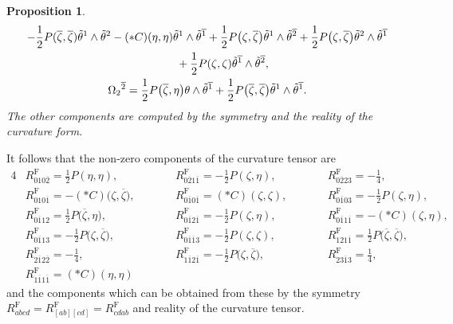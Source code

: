 \documentclass[11pt]{article}
\numberwithin{equation}{section}
\newcommand\ol{\overline}
\numberwithin{equation}{section}
\newtheorem{Proposition}[Theorem]{Proposition}
 { \theoremstyle{definition}
\newtheorem{Definition}[Theorem]{Definition}
\newtheorem*{Notation}{Notation}
\newtheorem{Example}[Theorem]{Example}
\newtheorem{Remark}[Theorem]{Remark} }
\begin{document}
\begin{Proposition}
\begin{gather*}
 -\frac{1}{2}P(\ol\zeta ,\ol\zeta)\tilde\theta^1\wedge\tilde\theta^2
-(*C)(\eta, \eta)\tilde\theta^1\wedge\tilde\theta^{\ol1}
+\frac{1}{2}
P\bigl(\zeta, \ol\zeta\bigr)\tilde\theta^1\wedge\tilde\theta^{\ol2}
+\frac{1}{2}P\bigl(\zeta, \ol\zeta\bigr)\tilde\theta^2\wedge\tilde\theta^{\ol1} \\
\hphantom{\Omega_1{}^2=}{}\hspace{0.2mm}
+\frac{1}{2}P(\zeta, \zeta)\tilde\theta^{\ol1}\wedge\tilde\theta^{\ol2}, \\
\Omega_2{}^{\ol2}=\frac{1}{2}P\bigl(\ol\zeta, \eta\bigr)\theta\wedge\tilde\theta^{\ol1}+\frac{1}{2}P\bigl(\ol\zeta, \ol\zeta\bigr)\tilde\theta^1\wedge\tilde\theta^{\ol1}.
\end{gather*}
The other components are computed by the symmetry and the reality of the curvature form.
\end{Proposition}
It follows that the non-zero components of the curvature tensor are
\begin{alignat*}{4}
&R^{\mathrm{F}}_{010\ol2}=\frac{1}{2}P(\eta, \eta),
\qquad&&
R^{\mathrm{F}}_{0\ol21\ol1}=-\frac{1}{2}P(\zeta, \eta),
\qquad&&
R^{\mathrm{F}}_{0\ol223}=-\frac{1}{4},& \\
&R^{\mathrm{F}}_{010\ol1}=-(*C)\bigl(\zeta, \ol\zeta\bigr),
\qquad&&
R^{\mathrm{F}}_{0\ol10\ol1}=(*C)(\zeta, \zeta),
\qquad&&
R^{\mathrm{F}}_{0\ol103}=-\frac{1}{2}P(\zeta, \eta),& \\
&R^{\mathrm{F}}_{0\ol112}=\frac{1}{2}P\bigl(\ol\zeta, \eta\bigr),
\qquad&&
R^{\mathrm{F}}_{0\ol12\ol1}=-\frac{1}{2}P(\zeta, \eta),
\qquad&&
R^{\mathrm{F}}_{0\ol11\ol1}=-(*C)(\zeta, \eta),& \\
&R^{\mathrm{F}}_{0\ol113}=-\frac{1}{2}P\bigl(\zeta, \ol\zeta\bigr),
\qquad&&
R^{\mathrm{F}}_{0\ol1\ol13}=-\frac{1}{2}P(\zeta, \zeta),
\qquad&&
R^{\mathrm{F}}_{121\ol1}=\frac{1}{2}P\bigl(\ol\zeta, \ol\zeta\bigr),& \\
&R^{\mathrm{F}}_{2\ol12\ol2}=-\frac{1}{4},
\qquad&&
R^{\mathrm{F}}_{1\ol12\ol1}=-\frac{1}{2}P\bigl(\zeta, \ol\zeta\bigr),
\qquad&&
R^{\mathrm{F}}_{23\ol13}=\frac{1}{4},& \\
&R^{\mathrm{F}}_{1\ol11\ol1}=(*C)(\eta, \eta)&
\end{alignat*}
and the components which can be obtained from these by the symmetry
$R^{\mathrm{F}}_{abcd}=R^{\mathrm{F}}_{[ab][cd]}=R^{\mathrm{F}}_{cdab}$ and reality of the curvature tensor.
\end{document}
